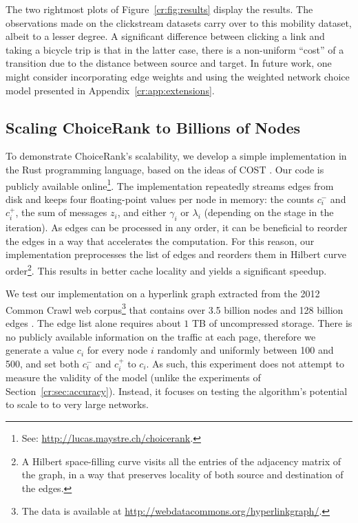 The two rightmost plots of Figure~\ref{cr:fig:results} display the results.
The observations made on the clickstream datasets carry over to this mobility dataset, albeit to a lesser degree.
A significant difference between clicking a link and taking a bicycle trip is that in the latter case, there is a non-uniform ``cost'' of a transition due to the distance between source and target.
In future work, one might consider incorporating edge weights and using the weighted network choice model presented in Appendix~\ref{cr:app:extensions}.


\subsection{Scaling ChoiceRank to Billions of Nodes}

To demonstrate ChoiceRank's scalability, we develop a simple implementation in the Rust programming language, based on the ideas of COST \citep{mcsherry2015scalability}.
Our code is publicly available online\footnote{See: \url{http://lucas.maystre.ch/choicerank}.}.
The implementation repeatedly streams edges from disk and keeps four floating-point values per node in memory:
the counts $c^-_i$ and $c^+_i$, the sum of messages $z_i$, and either $\gamma_i$ or $\lambda_i$ (depending on the stage in the iteration).
As edges can be processed in any order, it can be beneficial to reorder the edges in a way that accelerates the computation.
For this reason, our implementation preprocesses the list of edges and reorders them in Hilbert curve order\footnote{A Hilbert space-filling curve visits all the entries of the adjacency matrix of the graph, in a way that preserves locality of both source and destination of the edges.}.
This results in better cache locality and yields a significant speedup.

We test our implementation on a hyperlink graph extracted from the 2012 Common Crawl web corpus\footnote{
The data is available at \url{http://webdatacommons.org/hyperlinkgraph/}.} that contains over \num{3.5} billion nodes and \num{128} billion edges \citep{meusel2014graph}.
The edge list alone requires about $1$ TB of uncompressed storage.
There is no publicly available information on the traffic at each page, therefore we generate a value $c_i$ for every node $i$ randomly and uniformly between \num{100} and \num{500}, and set both $c^-_i$ and $c^+_i$ to $c_i$.
As such, this experiment does not attempt to measure the validity of the model (unlike the experiments of Section~\ref{cr:sec:accuracy}).
Instead, it focuses on testing the algorithm's potential to scale to to very large networks.

